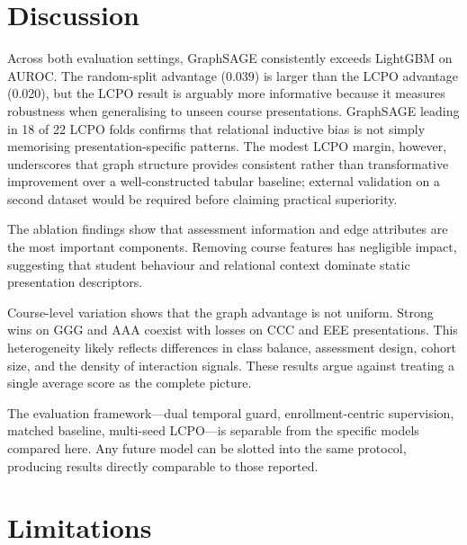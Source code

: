\documentclass[sigconf,review]{acmart}
\newcommand{\todo}[1]{\textcolor{red}{\textbf{[TODO: #1]}}}
\newcommand{\fullrun}[1]{#1}  %
\begin{document}
\section{Discussion}
\label{sec:discussion}

Across both evaluation settings, GraphSAGE consistently exceeds LightGBM on
AUROC.  The random-split advantage (\fullrun{0.039}) is larger than the LCPO
advantage (\fullrun{0.020}), but the LCPO result is arguably more
informative because it measures robustness when generalising to unseen
course presentations.  GraphSAGE leading in \fullrun{18 of 22} LCPO folds
confirms that relational inductive bias is not simply memorising
presentation-specific patterns.  The modest LCPO margin, however, underscores
that graph structure provides consistent rather than transformative improvement
over a well-constructed tabular baseline; external validation on a second
dataset would be required before claiming practical superiority.

The ablation findings show that assessment information and edge attributes are
the most important components.  Removing course features has negligible
impact, suggesting that student behaviour and relational context dominate
static presentation descriptors.

Course-level variation shows that the graph advantage is not uniform.  Strong
wins on GGG and AAA coexist with losses on CCC and EEE presentations.  This
heterogeneity likely reflects differences in class balance, assessment design,
cohort size, and the density of interaction signals.  These results argue
against treating a single average score as the complete picture.

The evaluation framework---dual temporal guard, enrollment-centric
supervision, matched baseline, multi-seed LCPO---is separable from the
specific models compared here.  Any future model can be slotted into the same
protocol, producing results directly comparable to those reported.

\section{Limitations}
\label{sec:limitations}
\end{document}
